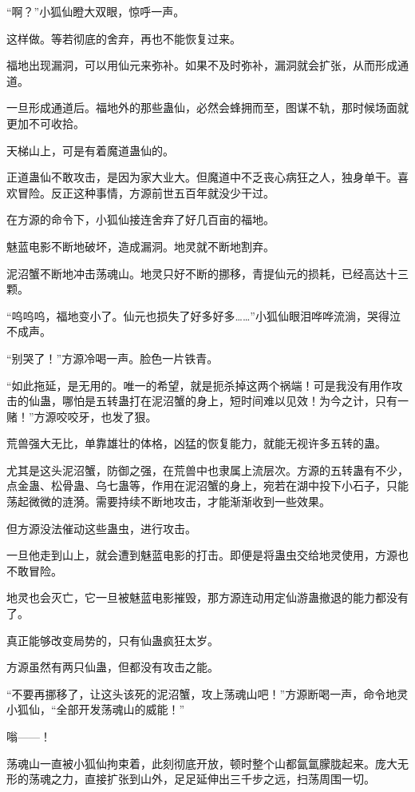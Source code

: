 \begin{this_body}
“啊？”小狐仙瞪大双眼，惊呼一声。

这样做。等若彻底的舍弃，再也不能恢复过来。

福地出现漏洞，可以用仙元来弥补。如果不及时弥补，漏洞就会扩张，从而形成通道。

一旦形成通道后。福地外的那些蛊仙，必然会蜂拥而至，图谋不轨，那时候场面就更加不可收拾。

天梯山上，可是有着魔道蛊仙的。

正道蛊仙不敢攻击，是因为家大业大。但魔道中不乏丧心病狂之人，独身单干。喜欢冒险。反正这种事情，方源前世五百年就没少干过。

在方源的命令下，小狐仙接连舍弃了好几百亩的福地。

魅蓝电影不断地破坏，造成漏洞。地灵就不断地割弃。

泥沼蟹不断地冲击荡魂山。地灵只好不断的挪移，青提仙元的损耗，已经高达十三颗。

“呜呜呜，福地变小了。仙元也损失了好多好多……”小狐仙眼泪哗哗流淌，哭得泣不成声。

“别哭了！”方源冷喝一声。脸色一片铁青。

“如此拖延，是无用的。唯一的希望，就是扼杀掉这两个祸端！可是我没有用作攻击的仙蛊，哪怕是五转蛊打在泥沼蟹的身上，短时间难以见效！为今之计，只有一赌！”方源咬咬牙，也发了狠。

荒兽强大无比，单靠雄壮的体格，凶猛的恢复能力，就能无视许多五转的蛊。

尤其是这头泥沼蟹，防御之强，在荒兽中也隶属上流层次。方源的五转蛊有不少，点金蛊、松骨蛊、乌七蛊等，作用在泥沼蟹的身上，宛若在湖中投下小石子，只能荡起微微的涟漪。需要持续不断地攻击，才能渐渐收到一些效果。

但方源没法催动这些蛊虫，进行攻击。

一旦他走到山上，就会遭到魅蓝电影的打击。即便是将蛊虫交给地灵使用，方源也不敢冒险。

地灵也会灭亡，它一旦被魅蓝电影摧毁，那方源连动用定仙游蛊撤退的能力都没有了。

真正能够改变局势的，只有仙蛊疯狂太岁。

方源虽然有两只仙蛊，但都没有攻击之能。

“不要再挪移了，让这头该死的泥沼蟹，攻上荡魂山吧！”方源断喝一声，命令地灵小狐仙，“全部开发荡魂山的威能！”

嗡——！

荡魂山一直被小狐仙拘束着，此刻彻底开放，顿时整个山都氤氲朦胧起来。庞大无形的荡魂之力，直接扩张到山外，足足延伸出三千步之远，扫荡周围一切。


\end{this_body}
